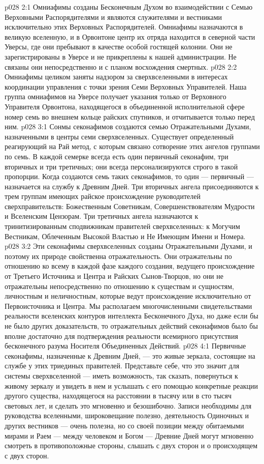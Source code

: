 \vs p028 2:1 Омниафимы созданы Бесконечным Духом во взаимодействии с Семью Верховными Распорядителями и являются служителями и вестниками исключительно этих Верховных Распорядителей. Омниафимы назначаются в великую вселенную, и в Орвонтоне центр их отряда находится в северной части Уверсы, где они пребывают в качестве особой гостящей колонии. Они не зарегистрированы в Уверсе и не прикреплены к нашей администрации. Не связаны они непосредственно и с планом восхождения смертных.
\vs p028 2:2 Омниафимы целиком заняты надзором за сверхвселенными в интересах координации управления с точки зрения Семи Верховных Управителей. Наша группа омниафимов на Уверсе получает указания только от Верховного Управителя Орвонтона, находящегося в объединенной исполнительной сфере номер семь во внешнем кольце райских спутников, и отчитывается только перед ним.
\vs p028 3:1 Сонмы секонафимов создаются семью Отражательными Духами, назначенными в центры семи сверхвселенных. Существует определенный реагирующий на Рай метод, с которым связано сотворение этих ангелов группами по семь. В каждой семерке всегда есть один первичный секонафим, три вторичных и три третичных; они всегда персонализируются строго в такой пропорции. Когда создаются семь таких секонафимов, то один --- первичный --- назначается на службу к Древним Дней. Три вторичных ангела присоединяются к трем группам имеющих райское происхождение руководителей сверхправительств: Божественным Советникам, Совершенствователям Мудрости и Вселенским Цензорам. Три третичных ангела назначаются к тринитизированным сподвижникам правителей сверхвселенных: к Могучим Вестникам, Облеченным Высокой Властью и Не Имеющим Имени и Номера.
\vs p028 3:2 Эти секонафимы сверхвселенных созданы Отражательными Духами, и поэтому их природе свойственна отражательность. Они отражательны по отношению ко всему в каждой фазе каждого создания, ведущего происхождение от Третьего Источника и Центра и Райских Сынов\hyp{}Творцов, но они не отражательны непосредственно по отношению к существам и сущностям, личностным и неличностным, которые ведут происхождение исключительно от Первоисточника и Центра. Мы располагаем многочисленными свидетельствами реальности вселенских контуров интеллекта Бесконечного Духа, но даже если бы не было других доказательств, то отражательных действий секонафимов было бы вполне достаточно для подтверждения реальности всемирного присутствия бесконечного разума Носителя Объединенных Действий.
\vs p028 4:1 Первичные секонафимы, назначенные к Древним Дней, --- это живые зеркала, состоящие на службе у этих триединых правителей. Представьте себе, что это значит для системы сверхвселенной --- иметь возможность, так сказать, повернуться к живому зеркалу и увидеть в нем и услышать с его помощью конкретные реакции другого существа, находящегося на расстоянии в тысячу или в сто тысяч световых лет, и сделать это мгновенно и безошибочно. Записи необходимы для руководства вселенными, широковещание полезно, деятельность Одиночных и других вестников --- очень полезна, но со своей позиции между обитаемыми мирами и Раем --- между человеком и Богом --- Древние Дней могут мгновенно смотреть в противоположные стороны, слышать с двух сторон и  о происходящем с двух сторон.
